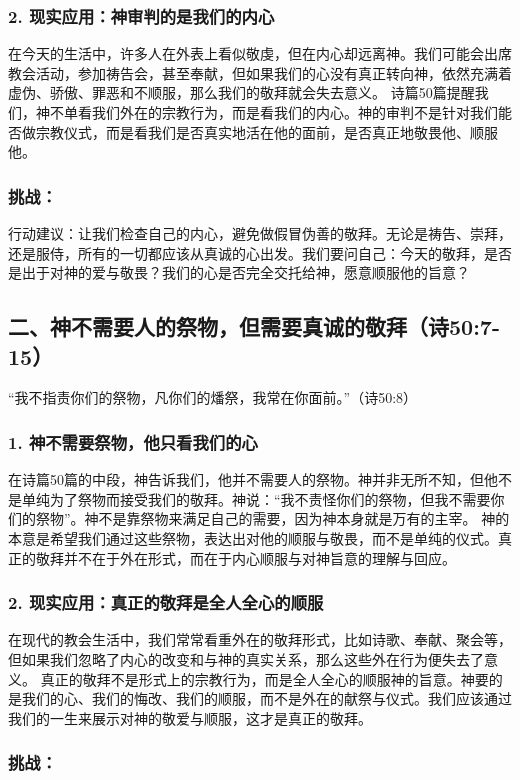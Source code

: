 \documentclass[a4paper, 12pt]{article}
\begin{document}
\subsubsection*{2. 现实应用：神审判的是我们的内心}
在今天的生活中，许多人在外表上看似敬虔，但在内心却远离神。我们可能会出席教会活动，参加祷告会，甚至奉献，但如果我们的心没有真正转向神，依然充满着虚伪、骄傲、罪恶和不顺服，那么我们的敬拜就会失去意义。
诗篇50篇提醒我们，神不单看我们外在的宗教行为，而是看我们的内心。神的审判不是针对我们能否做宗教仪式，而是看我们是否真实地活在他的面前，是否真正地敬畏他、顺服他。
\subsubsection*{挑战：}

行动建议：让我们检查自己的内心，避免做假冒伪善的敬拜。无论是祷告、崇拜，还是服侍，所有的一切都应该从真诚的心出发。我们要问自己：今天的敬拜，是否是出于对神的爱与敬畏？我们的心是否完全交托给神，愿意顺服他的旨意？
\subsection*{二、神不需要人的祭物，但需要真诚的敬拜（诗50:7-15）}
“我不指责你们的祭物，凡你们的燔祭，我常在你面前。”（诗50:8）

\subsubsection*{1. 神不需要祭物，他只看我们的心}
在诗篇50篇的中段，神告诉我们，他并不需要人的祭物。神并非无所不知，但他不是单纯为了祭物而接受我们的敬拜。神说：“我不责怪你们的祭物，但我不需要你们的祭物”。神不是靠祭物来满足自己的需要，因为神本身就是万有的主宰。
神的本意是希望我们通过这些祭物，表达出对他的顺服与敬畏，而不是单纯的仪式。真正的敬拜并不在于外在形式，而在于内心顺服与对神旨意的理解与回应。
\subsubsection*{2. 现实应用：真正的敬拜是全人全心的顺服}
在现代的教会生活中，我们常常看重外在的敬拜形式，比如诗歌、奉献、聚会等，但如果我们忽略了内心的改变和与神的真实关系，那么这些外在行为便失去了意义。
真正的敬拜不是形式上的宗教行为，而是全人全心的顺服神的旨意。神要的是我们的心、我们的悔改、我们的顺服，而不是外在的献祭与仪式。我们应该通过我们的一生来展示对神的敬爱与顺服，这才是真正的敬拜。
\subsubsection*{挑战：}
\end{document}

